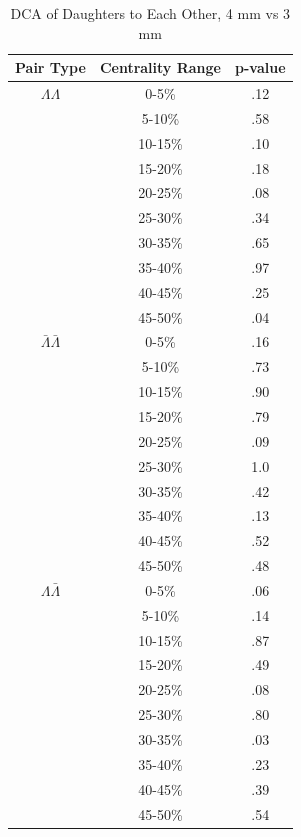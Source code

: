 \begin{table}
\begin{minipage}{18pc}

\caption {DCA of Daughters to Each Other, 4 mm vs 3 mm} \label{tab:DcaDaughtersEachOtherPvalueTests4mmVs3mm}
\begin{center}
\begin{tabular}{| c | c | c |}
  \hline                       
  Pair Type & Centrality Range & p-value \\
  \hline
  $\Lambda\Lambda$ & 0-5\% & .12 \\
   & 5-10\%  & .58 \\
   & 10-15\% & .10 \\
   & 15-20\% & .18 \\
   & 20-25\% & .08 \\
   & 25-30\% & .34 \\
   & 30-35\% & .65 \\
   & 35-40\% & .97 \\
   & 40-45\% & .25 \\
   & 45-50\% & .04 \\
   \hline
  $\bar{\Lambda}\bar{\Lambda}$ &  0-5\% & .16 \\
   & 5-10\% & .73 \\
   & 10-15\% & .90 \\
   & 15-20\% & .79 \\
   & 20-25\% & .09 \\
   & 25-30\% & 1.0 \\
   & 30-35\% & .42 \\
   & 35-40\% & .13 \\
   & 40-45\% & .52 \\
   & 45-50\% & .48 \\
   \hline
  $\Lambda\bar{\Lambda}$ &  0-5\% & .06 \\
   & 5-10\% & .14 \\
   & 10-15\% & .87 \\
   & 15-20\% & .49 \\
   & 20-25\% & .08 \\
   & 25-30\% & .80 \\
   & 30-35\% & .03 \\
   & 35-40\% & .23 \\
   & 40-45\% & .39 \\
   & 45-50\% & .54 \\
  \hline  
\end{tabular}
\end{center}
\end{minipage}

\end{table}
